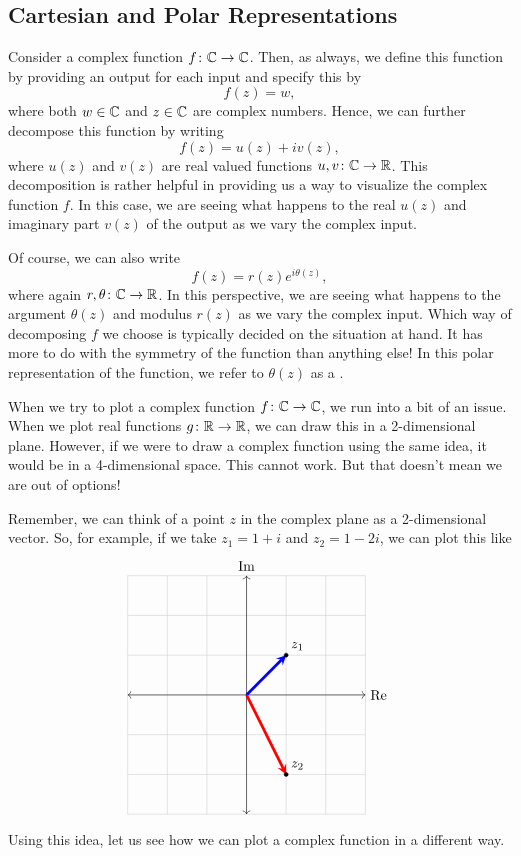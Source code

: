 \subsection{Cartesian and Polar Representations}

Consider a complex function $f\colon \mathbb{C} \to \mathbb{C}$.  Then, as always, we define this function by providing an output for each input and specify this by
\[
f(z)=w,
\]
where both $w\in \mathbb{C}$ and $z\in \mathbb{C}$ are complex numbers.  Hence, we can further decompose this function by writing
\[
f(z)=u(z)+iv(z),
\]
where $u(z)$ and $v(z)$ are real valued functions $u,v\colon \mathbb{C} \to \mathbb{R}$.  This decomposition is rather helpful in providing us a way to visualize the complex function $f$.  In this case, we are seeing what happens to the real $u(z)$ and imaginary part $v(z)$ of the output as we vary the complex input.

Of course, we can also write
\[
f(z)=r(z)e^{i\theta(z)},
\]
where again $r,\theta \colon \mathbb{C} \to \mathbb{R}$.  In this perspective, we are seeing what happens to the argument $\theta(z)$ and modulus $r(z)$ as we vary the complex input.  Which way of decomposing $f$ we choose is typically decided on the situation at hand.  It has more to do with the symmetry of the function than anything else! In this polar representation of the function, we refer to $\theta(z)$ as a .  



When we try to plot a complex function $f\colon \mathbb{C} \to \mathbb{C}$, we run into a bit of an issue.  When we plot real functions $g\colon \mathbb{R}\to \mathbb{R}$, we can draw this in a 2-dimensional plane. However, if we were to draw a complex function using the same idea, it would be in a 4-dimensional space. This cannot work.  But that doesn't mean we are out of options!

Remember, we can think of a point $z$ in the complex plane as a 2-dimensional vector. So, for example, if we take $z_1=1+i$ and $z_2 = 1-2i$, we can plot this like
\[
        \begin{tikzpicture}
        \draw[thin,gray!40] (-3,-3) grid (3,3);
        \draw[<->] (-3,0)--(3,0) node[right]{$\RE$};
        \draw[<->] (0,-3)--(0,3) node[above]{$\IM$};
        \draw[line width=2pt,blue,-stealth](0,0)--(1,1) node[anchor=east] at (1,1){};
        \draw[line width=2pt,red,-stealth](0,0)--(1,-2) node[anchor=east] at (1,-2){};
        \foreach \Point/\PointLabel in {(1,1)/z_1, (1,-2)/z_2}
        \draw[fill=black] \Point circle (0.05) node[above right] {$\PointLabel$};
        \end{tikzpicture}
\]
Using this idea, let us see how we can plot a complex function in a different way.

